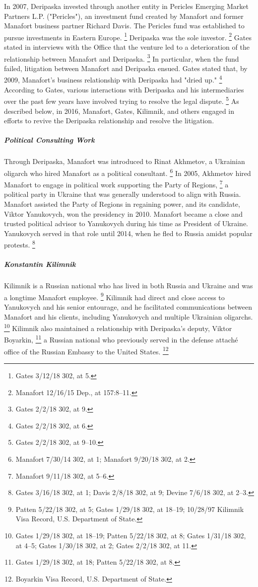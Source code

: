 In 2007, Deripaska invested through another entity in Pericles Emerging Market Partners L.P. ("Pericles"), an investment fund created by Manafort and former Manafort business partner Richard Davis.
The Pericles fund was established to pursue investments in Eastern Europe.%
\footnote{Gates 3/12/18 302, at 5.}
Deripaska was the sole investor.%
\footnote{Manafort 12/16/15 Dep., at 157:8--11.}
Gates stated in interviews with the Office that the venture led to a deterioration of the relationship between Manafort and Deripaska.%
\footnote{Gates 2/2/18 302, at 9.}
In particular, when the fund failed, litigation between Manafort and Deripaska ensued.
Gates stated that, by 2009, Manafort's business relationship with Deripaska had "dried up."%
\footnote{Gates 2/2/18 302, at 6.}
According to Gates, various interactions with Deripaska and his intermediaries over the past few years have involved trying to resolve the legal dispute.%
\footnote{Gates 2/2/18 302, at 9--10.}
As described below, in 2016, Manafort, Gates, Kilimnik, and others engaged in efforts to revive the Deripaska relationship and resolve the litigation.

\subparagraph{Political Consulting Work}

Through Deripaska, Manafort was introduced to Rinat Akhmetov, a Ukrainian oligarch who hired Manafort as a political consultant.%
\footnote{Manafort 7/30/14 302, at 1;
Manafort 9/20/18 302, at 2.}
In 2005, Akhmetov hired Manafort to engage in political work supporting the Party of Regions,%
\footnote{Manafort 9/11/18 302, at 5--6.}
a political party in Ukraine that was generally understood to align with Russia.
Manafort assisted the Party of Regions in regaining power, and its candidate, Viktor Yanukovych, won the presidency in 2010.
Manafort became a close and trusted political advisor to Yanukovych during his time as President of Ukraine.
Yanukovych served in that role until 2014, when he fled to Russia amidst popular protests.%
\footnote{Gates 3/16/18 302, at 1;
Davis 2/8/18 302, at 9;
Devine 7/6/18 302, at 2--3.}

\subparagraph{Konstantin Kilimnik}

Kilimnik is a Russian national who has lived in both Russia and Ukraine and was a longtime Manafort employee.%
\footnote{Patten 5/22/18 302, at 5;
Gates 1/29/18 302, at 18--19;
10/28/97 Kilimnik Visa Record, U.S. Department of State.}
Kilimnik had direct and close access to Yanukovych and his senior entourage, and he facilitated communications between Manafort and his clients, including Yanukovych and multiple Ukrainian oligarchs.%
\footnote{Gates 1/29/18 302, at 18--19;
Patten 5/22/18 302, at 8;
Gates 1/31/18 302, at 4--5;
Gates 1/30/18 302, at 2;
Gates 2/2/18 302, at 11.}
Kilimnik also maintained a relationship with Deripaska's deputy, Viktor Boyarkin,%
\footnote{Gates 1/29/18 302, at 18;
Patten 5/22/18 302, at 8.}
a Russian national who previously served in the defense attaché office of the Russian Embassy to the United States.%
\footnote{Boyarkin Visa Record, U.S. Department of State.}

